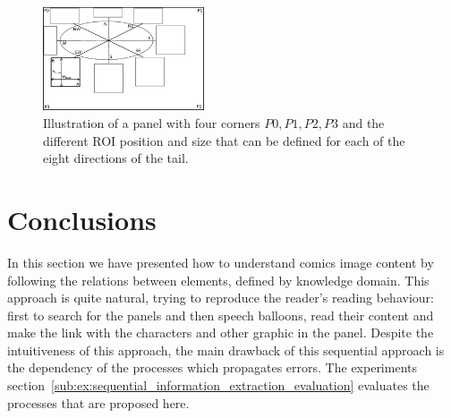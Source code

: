 

 \begin{figure}[!ht]
   \centering
  \includegraphics[width=180px]{roi_hypothesis.pdf}
  \caption[Illustration of the character region of interested computation for each of the eight directions of the tail]{Illustration of a panel with four corners $P0, P1, P2, P3$ and the different ROI position and size that can be defined for each of the eight directions of the tail.
  }
  \label{fig:se:roi_area}
 \end{figure}




\section{Conclusions}
\label{sec:se:conclusion}
In this section we have presented how to understand comics image content by following the relations between elements, defined by knowledge domain.
This approach is quite natural, trying to reproduce the reader's reading behaviour: first to search for the panels and then speech balloons, read their content and make the link with the characters and other graphic in the panel.
Despite the intuitiveness of this approach, the main drawback of this sequential approach is the dependency of the processes which propagates errors.
The experiments section~\ref{sub:ex:sequential_information_extraction_evaluation} evaluates the processes that are proposed here.

